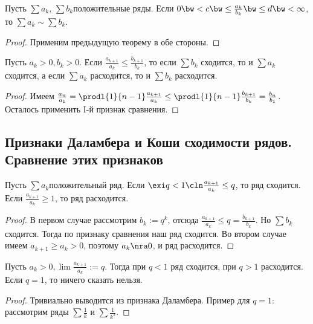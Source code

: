 \documentclass[a4paper]{article}
\begin{document}
\begin{theorem}
Пусть $\sum a_k$, $\sum b_k$\т положительные ряды. Если $0 \bw< c \bw\le \frac{a_k}{b_k} \bw\le d \bw< \infty$, то $\sum a_k\sim\sum b_k$.
\end{theorem}
\begin{proof}
Применим предыдущую теорему в обе стороны.
\end{proof}

\begin{theorem}
Пусть $a_k>0, b_k>0$. Если $\frac{a_{k+1}}{a_k} \le \frac{b_{k+1}}{b_k}$, то если $\sum b_k$ сходится, то и
$\sum a_k$ сходится, а если $\sum a_k$ расходится, то и $\sum b_k$ расходится.
\end{theorem}
\begin{proof}
Имеем $\frac{a_n}{a_1} = \prodl{1}{n-1} \frac{a_{k+1}}{a_k} \le \prodl{1}{n-1} \frac{b_{k+1}}{b_k} = \frac{b_n}{b_1}$. Осталось применить
I-й признак сравнения.
\end{proof}

\subsection{Признаки Даламбера и Коши сходимости рядов. Сравнение этих признаков}

\begin{theorem}
Пусть $\sum a_k$\т положительный ряд. Если $\exi q < 1\cln \frac{a_{k+1}}{a_k} \le q$, то ряд сходится.
Если $\frac{a_{k+1}}{a_k} \ge 1$, то ряд расходится.
\end{theorem}
\begin{proof}
В первом случае рассмотрим $b_k := q^k$, отсюда $\frac{a_{k+1}}{a_k} \le q = \frac{b_{k+1}}{b_k}$.
Но $\sum b_k$ сходится. Тогда по признаку сравнения наш ряд сходится. Во втором случае имеем
$a_{k+1} \ge a_k > 0$, поэтому $a_k \nra 0$, и ряд расходится.
\end{proof}

\begin{theorem}
Пусть $a_k > 0, \lim \frac{a_{k+1}}{a_k}:=q$. Тогда при $q < 1$ ряд сходится, при $q > 1$ расходится. Если $q=1$, то ничего сказать нельзя.
\end{theorem}
\begin{proof}
Тривиально выводится из признака Даламбера. Пример для $q=1$: рассмотрим ряды $\sum \frac{1}{k}$ и $\sum \frac{1}{k^2}$.
\end{proof}
\end{document}
